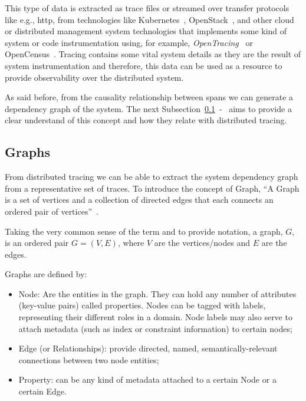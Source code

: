 This type of data is extracted as trace files or streamed over transfer protocols like e.g., \gls{http}, from technologies like Kubernetes~\cite{what_is_kubernetes}, OpenStack~\cite{what_is_opensatck}, and other cloud or distributed management system technologies that implements some kind of system or code instrumentation using, for example, \emph{OpenTracing}~\cite{what_is_opentracing} or OpenCensus~\cite{what_is_opencensus}. Tracing contains some vital system details as they are the result of system instrumentation and therefore, this data can be used as a resource to provide observability over the distributed system.

As said before, from the causality relationship between spans we can generate a dependency graph of the system. The next Subsection~\ref{subsec:graphs}~-~ aims to provide a clear understand of this concept and how they relate with distributed tracing.

\subsection{Graphs}
\label{subsec:graphs}

From distributed tracing we can be able to extract the system dependency graph from a representative set of traces. To introduce the concept of Graph, ``A Graph is a set of vertices and a collection of directed edges that each connects an ordered pair of vertices''~\cite{graph_standard_definition}.

Taking the very common sense of the term and to provide notation, a graph, $G$, is an ordered pair $G = (V, E)$, where $V$ are the vertices/nodes and $E$ are the edges.

Graphs are defined by:

\begin{itemize}
    \item Node: Are the entities in the graph. They can hold any number of attributes (key-value pairs) called properties. Nodes can be tagged with labels, representing their different roles in a domain. Node labels may also serve to attach metadata (such as index or constraint information) to certain nodes;
    \item Edge (or Relationships): provide directed, named, semantically-relevant connections between two node entities;
    \item Property: can be any kind of metadata attached to a certain Node or a certain Edge.
\end{itemize}


